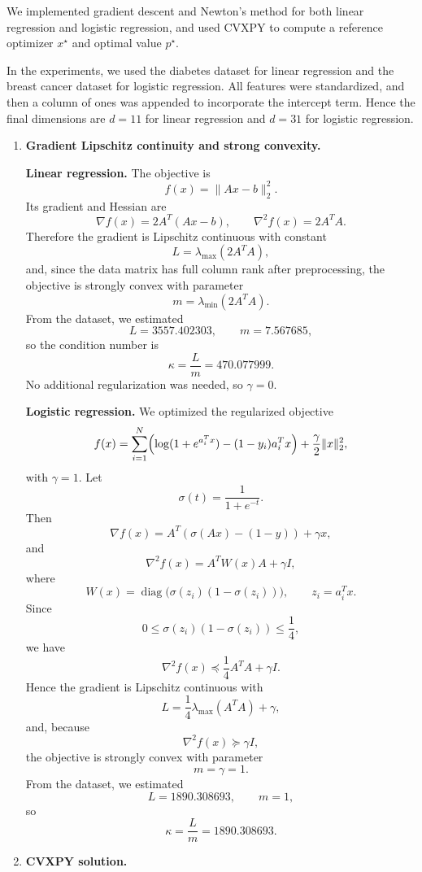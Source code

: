 \documentclass[11pt,letter,notitlepage]{article}
\theoremstyle{definition}
\begin{document}
\newpage

\begin{solution}

We implemented gradient descent and Newton's method for both linear regression and logistic regression, and used CVXPY to compute a reference optimizer $x^\star$ and optimal value $p^\star$.

In the experiments, we used the diabetes dataset for linear regression and the breast cancer dataset for logistic regression. All features were standardized, and then a column of ones was appended to incorporate the intercept term. Hence the final dimensions are $d=11$ for linear regression and $d=31$ for logistic regression.

\begin{enumerate}[label=(\alph*)]

\item \textbf{Gradient Lipschitz continuity and strong convexity.}

\textbf{Linear regression.}
The objective is
\[
f(x)=\|Ax-b\|_2^2.
\]
Its gradient and Hessian are
\[
\nabla f(x)=2A^T(Ax-b), \qquad \nabla^2 f(x)=2A^TA.
\]
Therefore the gradient is Lipschitz continuous with constant
\[
L=\lambda_{\max}(2A^TA),
\]
and, since the data matrix has full column rank after preprocessing, the objective is strongly convex with parameter
\[
m=\lambda_{\min}(2A^TA).
\]
From the dataset, we estimated
\[
L=3557.402303, \qquad m=7.567685,
\]
so the condition number is
\[
\kappa=\frac{L}{m}=470.077999.
\]
No additional regularization was needed, so $\gamma=0$.

\medskip

\textbf{Logistic regression.}
We optimized the regularized objective
\[
f(x)=\sum_{i=1}^N\Bigl(\log(1+e^{a_i^Tx})-(1-y_i)a_i^Tx\Bigr)+\frac{\gamma}{2}\|x\|_2^2,
\]
with $\gamma=1$.
Let
\[
\sigma(t)=\frac{1}{1+e^{-t}}.
\]
Then
\[
\nabla f(x)=A^T(\sigma(Ax)-(1-y))+\gamma x,
\]
and
\[
\nabla^2 f(x)=A^T W(x)A+\gamma I,
\]
where
\[
W(x)=\operatorname{diag}\bigl(\sigma(z_i)(1-\sigma(z_i))\bigr), \qquad z_i=a_i^Tx.
\]
Since
\[
0\le \sigma(z_i)(1-\sigma(z_i))\le \frac14,
\]
we have
\[
\nabla^2 f(x)\preceq \frac14 A^TA+\gamma I.
\]
Hence the gradient is Lipschitz continuous with
\[
L=\frac14\lambda_{\max}(A^TA)+\gamma,
\]
and, because
\[
\nabla^2 f(x)\succeq \gamma I,
\]
the objective is strongly convex with parameter
\[
m=\gamma=1.
\]
From the dataset, we estimated
\[
L=1890.308693, \qquad m=1,
\]
so
\[
\kappa=\frac{L}{m}=1890.308693.
\]

\item \textbf{CVXPY solution.}


\end{enumerate}
\end{solution}
\end{document}
